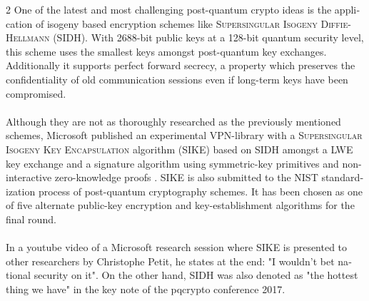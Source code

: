 \documentclass[a4paper,11pt]{article}
\begin{document}
\begin{otherlanguage}{english}
\begin{multicols}{2}
One of the latest and most challenging post-quantum crypto ideas is the application of isogeny based encryption schemes like \textsc{Supersingular Isogeny Diffie-Hellmann} (\textsc{SIDH}). With 2688-bit public keys at a 128-bit quantum security level, this scheme uses the smallest keys amongst post-quantum key exchanges. Additionally it supports perfect forward secrecy, a property which preserves the confidentiality of old communication sessions even if long-term keys have been compromised. \\
\\
Although they are not as thoroughly researched as the previously mentioned schemes, Microsoft published an experimental VPN-library with a \textsc{Supersingular Isogeny Key Encapsulation} algorithm (\textsc{SIKE}) based on \textsc{SIDH} amongst a \textsc{LWE} key exchange and a signature algorithm using symmetric-key primitives and non-interactive zero-knowledge proofs \cite{MSR}. \textsc{SIKE} is also submitted to the NIST standardization process of post-quantum cryptography schemes. It has been chosen as one of five alternate public-key encryption and key-establishment algorithms for the final round.\\
\\
In a youtube video of a Microsoft research session where \textsc{SIKE} is presented to other researchers by Christophe Petit, he states at the end: "I wouldn't bet national security on it". On the other hand, \textsc{SIDH} was also denoted as "the hottest thing we have" in the key note of the pqcrypto conference 2017. \\


\end{multicols}
\end{otherlanguage}
\end{document}
